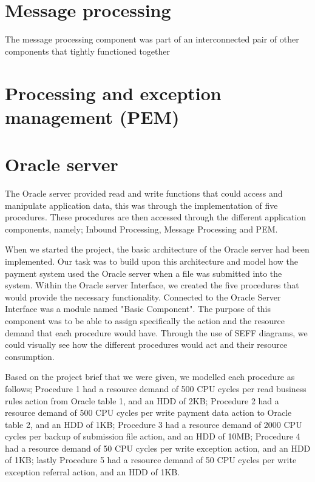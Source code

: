 \documentclass[a4paper,11pt]{report}
\begin{document}
\section*{Message processing}

The message processing component was part of an interconnected pair of other components that tightly functioned together 



\section*{Processing and exception management (PEM)}


\section*{Oracle server}
The Oracle server provided read and write functions that could access and manipulate application data, this was through the implementation of five procedures. These procedures are then accessed through the different application components, namely; Inbound Processing, Message Processing and PEM.\linebreak

When we started the project, the basic architecture of the Oracle server had been implemented. Our task was to build upon this architecture and model how the payment system used the Oracle server when a file was submitted into the system. Within the Oracle server Interface, we created the five procedures that would provide the necessary functionality. Connected to the Oracle Server Interface was a module named "Basic Component". The purpose of this component was to be able to assign specifically the action and the resource demand that each procedure would have. Through the use of SEFF diagrams, we could visually see how the different procedures would act and their resource consumption.

Based on the project brief that we were given, we modelled each procedure as follows; Procedure 1 had a resource demand of 500 CPU cycles per read business rules action from Oracle table 1, and an HDD of 2KB; Procedure 2 had a resource demand of 500 CPU cycles per write payment data action to Oracle table 2, and an HDD of 1KB; Procedure 3 had a resource demand of 2000 CPU cycles per backup of submission file action, and an HDD of 10MB; Procedure 4 had a resource demand of 50 CPU cycles per write exception action, and an HDD of 1KB; lastly Procedure 5 had a resource demand of 50 CPU cycles per write exception referral action, and an HDD of 1KB. 
\end{document}
